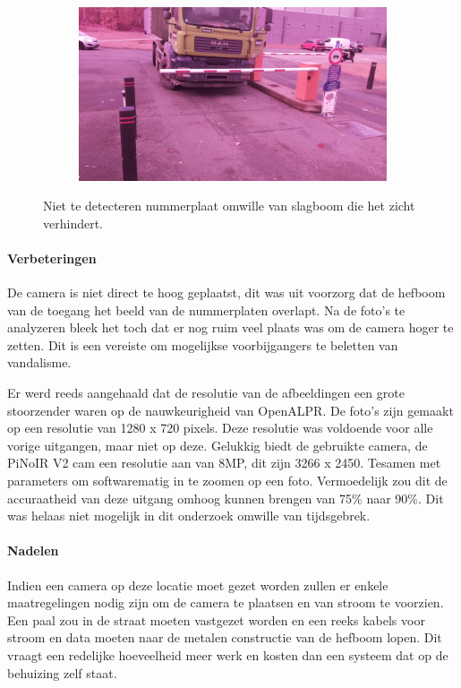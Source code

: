\begin{figure}[h!]
	\centering
	\begin{subfigure}[b]{0.99\linewidth}
		\includegraphics[width=\linewidth]{img/sterachter/sterachter3.jpg}
	\end{subfigure}
	\caption{Niet te detecteren nummerplaat omwille van slagboom die het zicht verhindert.}
	\label{fig:slagboomster}
\end{figure}

\paragraph{Verbeteringen}
De camera is niet direct te hoog geplaatst, dit was uit voorzorg dat de hefboom van de toegang het beeld van de nummerplaten overlapt. Na de foto's te analyzeren bleek het toch dat er nog ruim veel plaats was om de camera hoger te zetten. Dit is een vereiste om mogelijkse voorbijgangers te beletten van vandalisme.

Er werd reeds aangehaald dat de resolutie van de afbeeldingen een grote stoorzender waren op de nauwkeurigheid van OpenALPR. De foto's zijn gemaakt op een resolutie van 1280 x 720 pixels. Deze resolutie was voldoende voor alle vorige uitgangen, maar niet op deze.
Gelukkig biedt de gebruikte camera, de PiNoIR V2 cam een resolutie aan van 8MP, dit zijn 3266 x 2450. Tesamen met parameters om softwarematig in te zoomen op een foto. Vermoedelijk zou dit de accuraatheid van deze uitgang omhoog kunnen brengen van 75\% naar 90\%. Dit was helaas niet mogelijk in dit onderzoek omwille van tijdsgebrek.

\paragraph{Nadelen}
Indien een camera op deze locatie moet gezet worden zullen er enkele maatregelingen nodig zijn om de camera te plaatsen en van stroom te voorzien. Een paal zou in de straat moeten vastgezet worden en een reeks kabels voor stroom en data moeten naar de metalen constructie van de hefboom lopen. Dit vraagt een redelijke hoeveelheid meer werk en kosten dan een systeem dat op de behuizing zelf staat.

